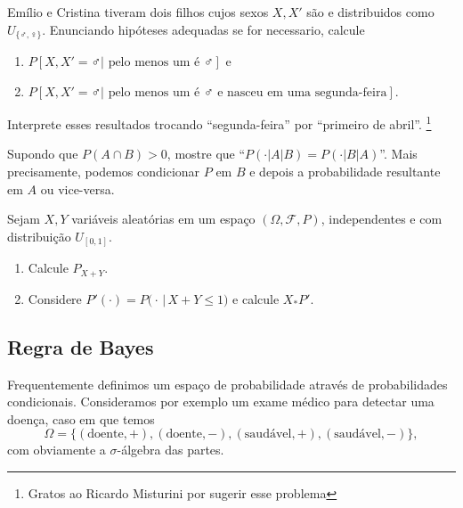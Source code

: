 \begin{topics}
\begin{exercise}
  Emílio e Cristina tiveram dois filhos cujos sexos $X, X'$ são \iid e distribuidos como $U_{\{\male, \female\}}$.
Enunciando hipóteses adequadas se for necessario,  calcule
  \begin{enumerate}[\quad a)]
  \item $P[X, X' = \male | \text{ pelo menos um é $\male$}]$ e
  \item $P[X, X' = \male | \text{ pelo menos um é $\male$ e nasceu em uma segunda-feira}]$.
  \end{enumerate}
  Interprete esses resultados trocando ``segunda-feira'' por ``primeiro de abril''.
  \footnote{Gratos ao Ricardo Misturini por sugerir esse problema}
\end{exercise}

\begin{exercise}
  Supondo que $P(A \cap B) > 0$, mostre que ``$P(\cdot|A|B) = P(\cdot|B|A)$''.
  Mais precisamente, podemos condicionar $P$ em $B$ e depois a probabilidade resultante em $A$ ou vice-versa.
\end{exercise}

\begin{exercise}
  Sejam $X, Y$ vari\'aveis aleat\'orias em um espaço $(\Omega, \mathcal{F}, P)$, independentes e com distribuição $U_{[0,1]}$.
  \begin{enumerate}[\quad a)]
  \item Calcule $ P_{X+Y}$.
  \item Considere $P'(\cdot) = P\big(\cdot \, | \, X + Y \leq 1 \big)$ e calcule $X_* P'$.
  \end{enumerate}
\end{exercise}


\subsection{Regra de Bayes}

Frequentemente definimos um espaço de probabilidade através de probabilidades condicionais.
Consideramos por exemplo um exame médico para detectar uma doença, caso em que temos
\begin{equation}
  \Omega = \{(\text{doente}, +), (\text{doente}, -), (\text{saudável}, +), (\text{saudável}, -)\},
\end{equation}
com obviamente a $\sigma$-álgebra das partes.


\end{topics}
